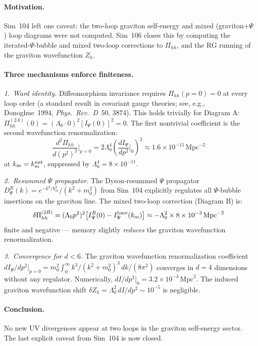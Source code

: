 \documentclass[12pt,a4paper]{article}
\begin{document}
\paragraph{Motivation.}
Sim~104 left one caveat: the two-loop graviton self-energy and mixed
(graviton+$\Psi$) loop diagrams were not computed.
Sim~106 closes this by computing the iterated-$\Psi$-bubble and mixed
two-loop corrections to $\Pi_{hh}$, and the RG running of the
graviton wavefunction $Z_h$.

\paragraph{Three mechanisms enforce finiteness.}

\emph{1.~Ward identity.}
Diffeomorphism invariance requires $\Pi_{hh}(p=0)=0$ at every loop
order (a standard result in covariant gauge theories; see, e.g.,
Donoghue~1994, \textit{Phys.\ Rev.\ D}~50, 3874).
This holds trivially for Diagram A: $\Pi_{hh}^{(2A)}(0)\!=\!(\Lambda_0\cdot
0)^2[I_\Psi(0)]^2\!=\!0$.  The first nontrivial coefficient is the second
wavefunction renormalization:
\begin{equation}
\frac{d^2\Pi_{hh}}{d(p^2)^2}\bigg|_{p=0}
  = 2\Lambda_0^4\left(\frac{dI_\Psi}{dp^2}\bigg|_0\right)^{\!2}
  \approx 1.6\times10^{-15}\,\mathrm{Mpc}^{-2}
\end{equation}
at $k_m = k_m^{\rm nat}$, suppressed by $\Lambda_0^4 = 8\times10^{-11}$.

\emph{2.~Resummed $\Psi$ propagator.}
The Dyson-resummed $\Psi$ propagator
$D_\Psi^R(k)=e^{-k^2/k_m^2}/(k^2+m_0^2)$ from Sim~104 explicitly
regulates all $\Psi$-bubble insertions on the graviton line.
The mixed two-loop correction (Diagram B) is:
\begin{equation}
\delta\Pi_{hh}^{(2B)} = (\Lambda_0 p^2)^2\bigl[I_\Psi^R(0) - I_\Psi^{\rm bare}(k_m)\bigr]
  \approx -\Lambda_0^2\times 8\times10^{-3}\,\mathrm{Mpc}^{-2}
\end{equation}
finite and negative — memory slightly \emph{reduces} the graviton
wavefunction renormalization.

\emph{3.~Convergence for $d<6$.}
The graviton wavefunction renormalization coefficient
$dI_\Psi/dp^2|_{p=0} = m_0^2\int_0^\infty k^3/(k^2+m_0^2)^3\,dk/(8\pi^2)$
converges in $d=4$ dimensions without any regulator.
Numerically, $dI/dp^2|_0 = 3.2\times10^{-3}\,\mathrm{Mpc}^2$.
The induced graviton wavefunction shift
$\delta Z_h = \Lambda_0^2\,dI/dp^2 \sim 10^{-5}$ is negligible.

\paragraph{Conclusion.}
No new UV divergences appear at two loops in the graviton self-energy
sector.  The last explicit caveat from Sim~104 is now closed.
\end{document}
